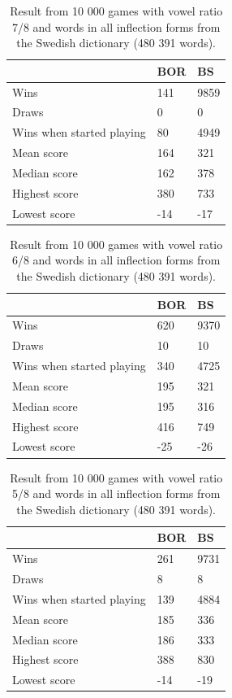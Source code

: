 \documentclass[a4paper, 12pt]{report}
\begin{document}
\begin{table}[h]
\centering
    \begin{tabular}{ l | l | l }
   	& BOR & BS \\
   	\hline
   	Wins & 141 & 9859 \\
	Draws & 0 & 0 \\
	Wins when started playing & 80 & 4949 \\   	
	Mean score & 164 & 321 \\
	Median score & 162 & 378\\	 	 
	Highest score & 380 & 733 \\
	Lowest score & -14 & -17 \\		
    \end{tabular}
\caption{Result from 10 000 games with vowel ratio 7/8 and words in all inflection forms from the Swedish dictionary (480 391 words).}
\label{tab:borbsstats7}
\end{table}

\begin{table}[h]
\centering
    \begin{tabular}{ l | l | l }
   	& BOR & BS \\
   	\hline
   	Wins & 620 & 9370\\
	Draws & 10 & 10 \\
	Wins when started playing & 340 & 4725 \\   	
	Mean score & 195 & 321 \\
	Median score & 195 & 316 \\	 	 
	Highest score & 416 & 749 \\
	Lowest score & -25 & -26 \\		
    \end{tabular}
\caption{Result from 10 000 games with vowel ratio 6/8 and words in all inflection forms from the Swedish dictionary (480 391 words).}
\label{tab:borbsstats6}
\end{table}

\begin{table}[h]
\centering
    \begin{tabular}{ l | l | l }
   	& BOR & BS \\
   	\hline
   	Wins & 261 & 9731\\
	Draws & 8 & 8 \\
	Wins when started playing & 139 & 4884 \\   	
	Mean score & 185 & 336 \\
	Median score & 186 & 333 \\	 	 
	Highest score & 388 & 830 \\
	Lowest score & -14 & -19 \\		
    \end{tabular}
\caption{Result from 10 000 games with vowel ratio 5/8 and words in all inflection forms from the Swedish dictionary (480 391 words).}
\label{tab:borbsstats5}
\end{table}
\end{document}
